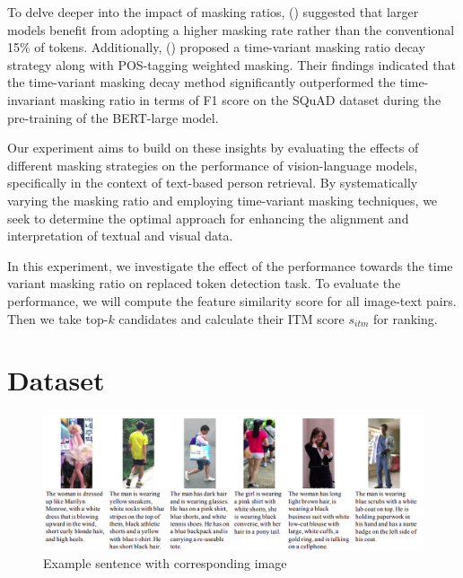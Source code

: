 To delve deeper into the impact of masking ratios, (\cite{wettig-etal-2023-mask}) suggested that larger models benefit from adopting a higher masking rate rather than the  conventional 15\% of tokens. Additionally, (\cite{yang2023learningbettermaskingbetter}) proposed a time-variant masking ratio decay strategy along with POS-tagging weighted masking. Their findings indicated that the time-variant masking decay method significantly outperformed the time-invariant masking ratio in terms of F1 score on the SQuAD dataset during the pre-training of the BERT-large model.

Our experiment aims to build on these insights by evaluating the effects of different masking strategies on the performance of vision-language models, specifically in the context of text-based person retrieval. By systematically varying the masking ratio and employing time-variant masking techniques, we seek to determine the optimal approach for enhancing the alignment and interpretation of textual and visual data.

In this experiment, we investigate the effect of the performance towards the time variant masking ratio on replaced token detection task. To evaluate the performance, we will compute the feature similarity score for all image-text pairs. Then we take top-$k$ candidates and calculate their ITM score $s_{itm}$ for ranking. 

\section{Dataset}

\begin{figure}[htbp]
  \begin{center}
      \includegraphics[width=\linewidth]{img/cuhk_pedes.png}
      \caption{Example sentence with corresponding image}
      \label{fig:cuhk_pedes}
  \end{center}
\end{figure}


